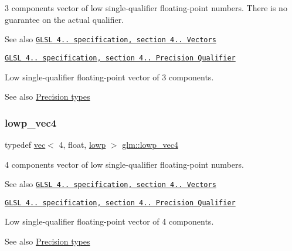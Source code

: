 3 components vector of low single-\/qualifier floating-\/point numbers. There is no guarantee on the actual qualifier.

\begin{DoxySeeAlso}{See also}
\href{http://www.opengl.org/registry/doc/GLSLangSpec.4.20.8.pdf}{\tt G\+L\+SL 4.. specification, section 4.. Vectors} 

\href{http://www.opengl.org/registry/doc/GLSLangSpec.4.20.8.pdf}{\tt G\+L\+SL 4.. specification, section 4.. Precision Qualifier}
\end{DoxySeeAlso}
Low single-\/qualifier floating-\/point vector of 3 components. \begin{DoxySeeAlso}{See also}
\hyperlink{group__core__precision}{Precision types} 
\end{DoxySeeAlso}
\mbox{\label{group__core__precision_ga9235d8ac062ef68826948ac1df016036}} 
\subsubsection{\texorpdfstring{lowp\+\_\+vec4}{lowp\_vec4}}
{\footnotesize\ttfamily typedef \hyperlink{structglm_1_1vec}{vec}$<$ 4, float, \hyperlink{namespaceglm_a36ed105b07c7746804d7fdc7cc90ff25ae161af3fc695e696ce3bf69f7332bc2d}{lowp} $>$ \hyperlink{group__core__precision_ga9235d8ac062ef68826948ac1df016036}{glm\+::lowp\+\_\+vec4}}

4 components vector of low single-\/qualifier floating-\/point numbers.

\begin{DoxySeeAlso}{See also}
\href{http://www.opengl.org/registry/doc/GLSLangSpec.4.20.8.pdf}{\tt G\+L\+SL 4.. specification, section 4.. Vectors} 

\href{http://www.opengl.org/registry/doc/GLSLangSpec.4.20.8.pdf}{\tt G\+L\+SL 4.. specification, section 4.. Precision Qualifier}
\end{DoxySeeAlso}
Low single-\/qualifier floating-\/point vector of 4 components. \begin{DoxySeeAlso}{See also}
\hyperlink{group__core__precision}{Precision types} 
\end{DoxySeeAlso}
\mbox{\label{group__core__precision_ga84008d451452ffe0f6c8f395fd61a8df}} 

